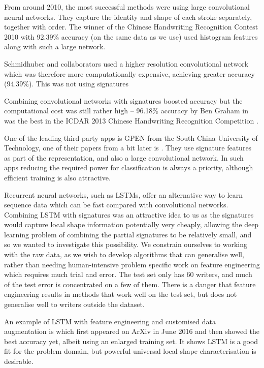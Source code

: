 From around 2010, the most successful methods were using large convolutional neural networks. They capture the identity and shape of each stroke separately, together with order.  The winner of the Chinese Handwriting Recognition Contest 2010 \cite{chinese2010} with 92.39\% accuracy (on the same data as we use) used histogram features along with such a large network.

Schmidhuber and collaborators \cite{multicolumn} used a higher resolution convolutional network which was therefore more computationally expensive, achieving greater accuracy (94.39\%). %
This was not using signatures

Combining convolutional networks with signatures boosted accuracy but the computational cost was still rather high
-- 96.18\% accuracy by Ben Graham in \cite{BEN} was the best in the ICDAR 2013 Chinese
Handwriting Recognition Competition \cite{chinese2013}.

One of the leading third-party apps is GPEN \cite{GPEN} from the South China University of Technology, one of their papers from a bit later is \cite{Improved}. They use
signature features as part of the representation, and also a large convolutional network. In such apps reducing the required power for classification is always a priority, although efficient training is also attractive.

Recurrent neural networks, such as LSTMs, offer an alternative way to learn sequence data which can be fast compared with convolutional networks. 
Combining LSTM with signatures was an attractive idea to us as the signatures would capture local shape information potentially very cheaply, allowing the deep learning problem of combining the partial signatures to be relatively small, and so we wanted to investigate this possibility.  We constrain ourselves to working with the raw data, as we wish to develop algorithms that can generalise well, rather than needing human-intensive problem specific work on feature engineering which requires much trial and error. The test set only has 60 writers, and much of the test error is concentrated on a few of them. There is a danger that feature engineering results in methods that work well on the test set, but does not generalise well to writers outside the dataset. 

An example of LSTM with feature engineering and customised data augmentation is \cite{BengioChinese1} which first appeared on ArXiv in June 2016 and then showed the best accuracy yet, albeit using an enlarged training set. It shows LSTM is a good fit for the problem domain, but powerful universal local shape characterisation is desirable.

